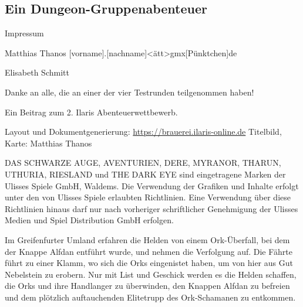 
\begin{centering}
\section*{Ein Dungeon-Gruppenabenteuer}
\end{centering}

Impressum


Matthias Thanos  
[vorname].[nachname]<ätt>gmx[Pünktchen]de


Elisabeth Schmitt


Danke an alle, die an einer der vier Testrunden teilgenommen haben!


Ein Beitrag zum 2. Ilaris Abenteuerwettbewerb.


Layout und Dokumentgenerierung: \url{https://brauerei.ilaris-online.de} 
Titelbild, Karte: Matthias Thanos


DAS SCHWARZE AUGE, AVENTURIEN, DERE, MYRANOR, THARUN, UTHURIA, RIESLAND 
und THE DARK EYE sind eingetragene Marken der Ulisses Spiele GmbH, Waldems. 
Die Verwendung der Grafiken und Inhalte erfolgt unter den von Ulisses Spiele erlaubten Richtlinien. 
Eine Verwendung über diese Richtlinien hinaus darf nur nach vorheriger schriftlicher 
Genehmigung der Ulisses Medien und Spiel Distribution GmbH erfolgen.


Im Greifenfurter Umland erfahren die Helden von einem Ork-Überfall, bei dem der Knappe Alfdan entführt wurde, und nehmen die Verfolgung auf. Die Fährte führt zu einer Klamm, wo sich die Orks eingenistet haben, um von hier aus Gut Nebelstein zu erobern. Nur mit List und Geschick werden es die Helden schaffen, die Orks und ihre Handlanger zu überwinden, den Knappen Alfdan zu befreien und dem plötzlich auftauchenden Elitetrupp des Ork-Schamanen zu entkommen.




